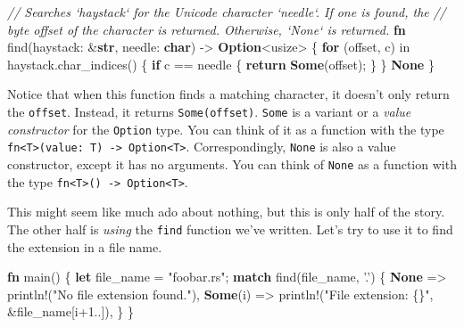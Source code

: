 \documentclass[a4paper,]{book}
\newenvironment{Shaded}{\begin{snugshade}}{\end{snugshade}}
\newcommand{\KeywordTok}[1]{\textcolor[rgb]{0.13,0.29,0.53}{\textbf{{#1}}}}
\newcommand{\DecValTok}[1]{\textcolor[rgb]{0.00,0.00,0.81}{{#1}}}
\newcommand{\CharTok}[1]{\textcolor[rgb]{0.31,0.60,0.02}{{#1}}}
\newcommand{\StringTok}[1]{\textcolor[rgb]{0.31,0.60,0.02}{{#1}}}
\newcommand{\CommentTok}[1]{\textcolor[rgb]{0.56,0.35,0.01}{\textit{{#1}}}}
\newcommand{\OtherTok}[1]{\textcolor[rgb]{0.56,0.35,0.01}{{#1}}}
\newcommand{\NormalTok}[1]{{#1}}
\begin{document}

\begin{Shaded}
\begin{Highlighting}[]
\CommentTok{// Searches `haystack` for the Unicode character `needle`. If one is found, the}
\CommentTok{// byte offset of the character is returned. Otherwise, `None` is returned.}
\KeywordTok{fn} \NormalTok{find(haystack: &}\KeywordTok{str}\NormalTok{, needle: }\KeywordTok{char}\NormalTok{) -> }\KeywordTok{Option}\NormalTok{<usize> \{}
    \KeywordTok{for} \NormalTok{(offset, c) in haystack.char_indices() \{}
        \KeywordTok{if} \NormalTok{c == needle \{}
            \KeywordTok{return} \KeywordTok{Some}\NormalTok{(offset);}
        \NormalTok{\}}
    \NormalTok{\}}
    \KeywordTok{None}
\NormalTok{\}}
\end{Highlighting}
\end{Shaded}

Notice that when this function finds a matching character, it doesn't
only return the \texttt{offset}. Instead, it returns
\texttt{Some(offset)}. \texttt{Some} is a variant or a \emph{value
constructor} for the \texttt{Option} type. You can think of it as a
function with the type
\texttt{fn\textless{}T\textgreater{}(value:\ T)\ -\textgreater{}\ Option\textless{}T\textgreater{}}.
Correspondingly, \texttt{None} is also a value constructor, except it
has no arguments. You can think of \texttt{None} as a function with the
type
\texttt{fn\textless{}T\textgreater{}()\ -\textgreater{}\ Option\textless{}T\textgreater{}}.

This might seem like much ado about nothing, but this is only half of
the story. The other half is \emph{using} the \texttt{find} function
we've written. Let's try to use it to find the extension in a file name.

\begin{Shaded}
\begin{Highlighting}[]
\KeywordTok{fn} \NormalTok{main() \{}
    \KeywordTok{let} \NormalTok{file_name = }\StringTok{"foobar.rs"}\NormalTok{;}
    \KeywordTok{match} \NormalTok{find(file_name, }\CharTok{'.'}\NormalTok{) \{}
        \KeywordTok{None} \NormalTok{=> }\OtherTok{println!}\NormalTok{(}\StringTok{"No file extension found."}\NormalTok{),}
        \KeywordTok{Some}\NormalTok{(i) => }\OtherTok{println!}\NormalTok{(}\StringTok{"File extension: \{\}"}\NormalTok{, &file_name[i+}\DecValTok{1.}\NormalTok{.]),}
    \NormalTok{\}}
\NormalTok{\}}
\end{Highlighting}
\end{Shaded}
\end{document}
